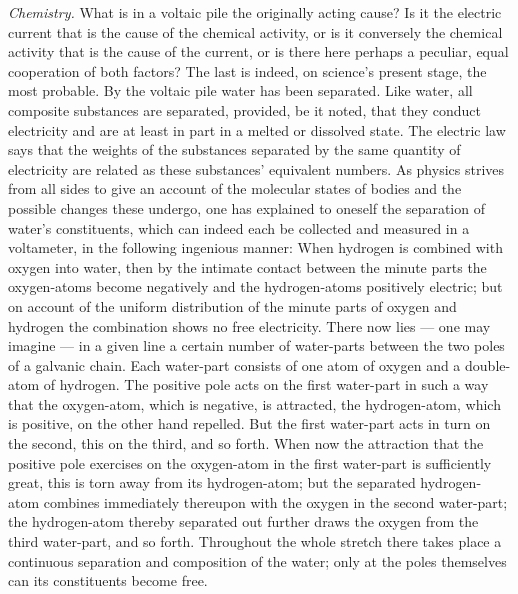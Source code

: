 \documentclass[12pt]{book}
\begin{document}
\emph{Chemistry.} What is in a voltaic pile the originally acting cause? Is it the
electric current that is the cause of the chemical activity, or is it conversely the
chemical activity that is the cause of the current, or is there here perhaps a
peculiar, equal cooperation of both factors? The last is indeed, on science's present
stage, the most probable. By the voltaic pile water has been separated. Like water,
all composite substances are separated, provided, be it noted, that they conduct
electricity and are at least in part in a melted or dissolved state. The electric law
says that the weights of the substances separated by the same quantity of electricity
are related as these substances' equivalent numbers. As physics strives from all
sides to give an account of the molecular states of bodies and the possible changes
these undergo, one has explained to oneself the separation of water's constituents,
which can indeed each be collected and measured in a voltameter, in the following
ingenious manner: When hydrogen is combined with oxygen into water, then by the
intimate contact between the minute parts the oxygen-atoms become negatively and the
hydrogen-atoms positively electric; but on account of the uniform distribution of the
minute parts of oxygen and hydrogen the combination shows no free electricity. There
now lies --- one may imagine --- in a given line a certain number of water-parts
between the two poles of a galvanic chain. Each water-part consists of one atom of
oxygen and a double-atom of hydrogen. The positive pole acts on the first water-part
in such a way that the oxygen-atom, which is negative, is attracted, the
hydrogen-atom, which is positive, on the other hand repelled. But the first
water-part acts in turn on the second, this on the third, and so forth. When now the
attraction that the positive pole exercises on the oxygen-atom in the first
water-part is sufficiently great, this is torn away from its hydrogen-atom; but the
separated hydrogen-atom combines immediately thereupon with the oxygen in the second
water-part; the hydrogen-atom thereby separated out further draws the oxygen from the
third water-part, and so forth. Throughout the whole stretch there takes place a
continuous separation and composition of the water; only at the poles themselves can
its constituents become free.
\end{document}
